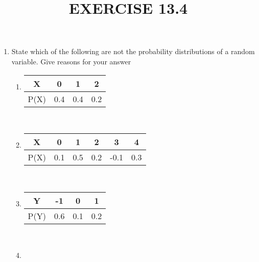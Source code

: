 \documentclass[12pt]{article}
\begin{document}
\begin{center}
\title{\textbf{EXERCISE 13.4}}
\date{\vspace{-5ex}} %
\maketitle
\end{center}

\setcounter{page}{1}

\begin{enumerate}
\item State which of the following are not the probability distributions of a random 
variable. Give reasons for your answer
\renewcommand{\labelenumii}{\roman{enumii}}
\begin{enumerate}
\item \begin{tabular}{|c|c|c|c|}
    \hline
    \cellcolor{blue!30}X & \cellcolor{blue!40}0& \cellcolor{blue!20}1 & \cellcolor{blue!30}2 \\
    \hline
    \cellcolor{blue!30}P(X) & \cellcolor{blue!30}0.4& \cellcolor{blue!30}0.4& \cellcolor{blue!30}0.2 \\
    \hline
\end{tabular}
\\
\item \begin{tabular}{|c|c|c|c|c|c|}
    \hline
    \cellcolor{blue!30}X & \cellcolor{blue!60}0& \cellcolor{blue!60}1 & \cellcolor{blue!40}2& \cellcolor{blue!30}3& \cellcolor{blue!40}4 \\
    \hline
    \cellcolor{blue!40}P(X) & \cellcolor{blue!50}0.1& \cellcolor{blue!50}0.5& \cellcolor{blue!50}0.2& \cellcolor{blue!50}-0.1& \cellcolor{blue!60}0.3 \\
    \hline
\end{tabular}
\\
\item \begin{tabular}{|c|c|c|c|}
    \hline
    \cellcolor{blue!30}Y & \cellcolor{blue!60}-1& \cellcolor{blue!60}0 & \cellcolor{blue!90}1 \\
    \hline
    \cellcolor{blue!40}P(Y) & \cellcolor{blue!50}0.6& \cellcolor{blue!50}0.1& \cellcolor{blue!60}0.2 \\
    \hline
\end{tabular}
\\
\item \begin{tabular}{|c|c|c|c|c|c|}

\end{tabular}
\end{enumerate}
\end{enumerate}
\end{document}
